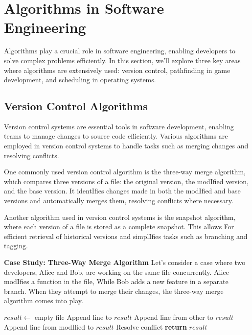 \documentclass[12pt]{book} %
\begin{document}
\section{Algorithms in Software Engineering}
Algorithms play a crucial role in software engineering, enabling developers to solve complex problems efficiently. In this section, we'll explore three key areas where algorithms are extensively used: version control, pathfinding in game development, and scheduling in operating systems.

\subsection{Version Control Algorithms}
Version control systems are essential tools in software development, enabling teams to manage changes to source code efficiently. Various algorithms are employed in version control systems to handle tasks such as merging changes and resolving conflicts.

One commonly used version control algorithm is the three-way merge algorithm, which compares three versions of a file: the original version, the modIfied version, and the base version. It identIfies changes made in both the modIfied and base versions and automatically merges them, resolving conflicts where necessary.

Another algorithm used in version control systems is the snapshot algorithm, where each version of a file is stored as a complete snapshot. This allows For efficient retrieval of historical versions and simplIfies tasks such as branching and tagging.

\textbf{Case Study: Three-Way Merge Algorithm}
Let's consider a case where two developers, Alice and Bob, are working on the same file concurrently. Alice modIfies a function in the file, While Bob adds a new feature in a separate branch. When they attempt to merge their changes, the three-way merge algorithm comes into play.

\FloatBarrier
\begin{algorithm}
\caption{Three-Way Merge Algorithm}
\begin{algorithmic}[1]
    \State $result \gets$ empty file
            \State Append line to $result$
            \State Append line from other to $result$
            \State Append line from modIfied to $result$
        \Else
            \State Resolve conflict
        \EndIf
    \EndWhile
    \State \textbf{return} $result$
\EndProcedure
\end{algorithmic}
\end{algorithm}
\FloatBarrier
\end{document}
